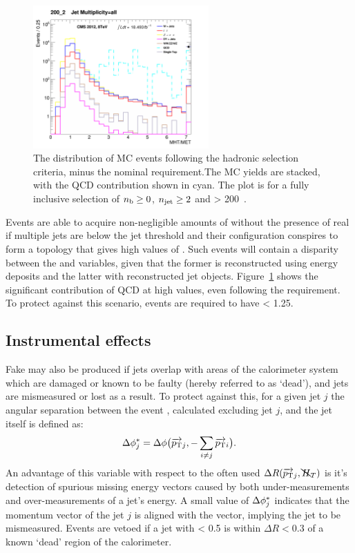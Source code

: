 \begin{figure}[t]
\centering
\includegraphics[width=0.6\textwidth]
{Figs/datamc/had/v1/Stacked_MHTovMET_all_200_upwards.png}
\caption{The \mhtmet distribution of MC events following the hadronic selection
criteria, minus the nominal \mhtmet requirement.The MC yields are stacked,
with the QCD contribution shown in cyan. The plot is for a fully inclusive
selection of $n_{\text{b}} \geq 0$, $n_{\text{jet}} \geq 2$ and \HT > 200~\gev.}
\label{fig:full_mhtmet_distro}
\end{figure}

Events are able to acquire non-negligible amounts of \mht without the presence
of
real \met if multiple jets are below the jet \Pt threshold and their
configuration conspires to form a topology that gives high values of \alphat.
Such events will contain a disparity between the \met and
\mht variables, given that the former is reconstructed using energy deposits
and the latter with reconstructed jet objects.
Figure~\ref{fig:full_mhtmet_distro} shows the significant contribution of QCD at
high \mhtmet values, even following the \alphat requirement.
To protect against this scenario, events are required to have \mhtmet < 1.25.


\subsection{Instrumental effects}

Fake \mht may also be produced if jets overlap with areas of the calorimeter 
system which are damaged or known to be faulty (hereby referred to as `dead'),
and jets are mismeasured or lost as a result. To protect against this, for a
given jet $j$ the angular separation between the event \mht, calculated
excluding jet $j$, and the jet itself is defined as:
% 
\begin{equation}
\Delta \phi^*_j = \Delta \phi\big(\overrightarrow{{p_{\text T}}}_j,-\sum_{i\neq j}
{\overrightarrow{{p_{\text T}}}_i}\big) .
\label{eq:biasdphi}
\end{equation}
% 
An advantage of this variable with respect to the often used
$\Delta R(\overrightarrow{{p_{\text T}}}_j, \bcancel{H}_T)$ is it's detection of spurious missing
energy vectors
caused
by both under-measurements and over-measurements of a jet's energy.
A small value of $\Delta \phi^*_j$ indicates that the momentum vector of the jet $j$
is aligned with the \mht vector, implying the jet to be mismeasured. Events are
vetoed if a jet with \dphistar< 0.5 is within $\Delta R < 0.3$ of a known
`dead' region of the calorimeter.

